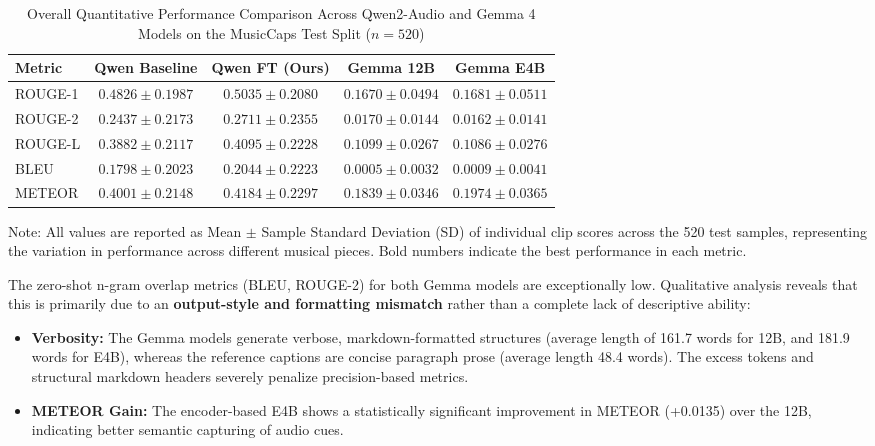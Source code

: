 \documentclass[12pt, conference, letterpaper]{IEEEtran}
\begin{document}
\begin{table}[t]
    \caption{Overall Quantitative Performance Comparison Across Qwen2-Audio and Gemma 4 Models on the MusicCaps Test Split ($n=520$)}
    \label{tab:gemma_zeroshot}
    \centering
    \footnotesize
    \begin{tabular}{lcccc}
        \toprule
        \textbf{Metric} & \textbf{Qwen Baseline} & \textbf{Qwen FT (Ours)}      & \textbf{Gemma 12B}  & \textbf{Gemma E4B}  \\ \midrule
        ROUGE-1         & $0.4826 \pm 0.1987$    & $\mathbf{0.5035 \pm 0.2080}$ & $0.1670 \pm 0.0494$ & $0.1681 \pm 0.0511$ \\
        ROUGE-2         & $0.2437 \pm 0.2173$    & $\mathbf{0.2711 \pm 0.2355}$ & $0.0170 \pm 0.0144$ & $0.0162 \pm 0.0141$ \\
        ROUGE-L         & $0.3882 \pm 0.2117$    & $\mathbf{0.4095 \pm 0.2228}$ & $0.1099 \pm 0.0267$ & $0.1086 \pm 0.0276$ \\
        BLEU            & $0.1798 \pm 0.2023$    & $\mathbf{0.2044 \pm 0.2223}$ & $0.0005 \pm 0.0032$ & $0.0009 \pm 0.0041$ \\
        METEOR          & $0.4001 \pm 0.2148$    & $\mathbf{0.4184 \pm 0.2297}$ & $0.1839 \pm 0.0346$ & $0.1974 \pm 0.0365$ \\
        \bottomrule
    \end{tabular}
    \vspace{1ex}
    \begin{flushleft}
        \scriptsize Note: All values are reported as Mean $\pm$ Sample Standard Deviation (SD) of individual clip scores across the 520 test samples, representing the variation in performance across different musical pieces. Bold numbers indicate the best performance in each metric.
    \end{flushleft}
\end{table}

The zero-shot n-gram overlap metrics (BLEU, ROUGE-2) for both Gemma models are exceptionally low. Qualitative analysis reveals that this is primarily due to an \textbf{output-style and formatting mismatch} rather than a complete lack of descriptive ability:
\begin{itemize}
    \item \textbf{Verbosity:} The Gemma models generate verbose, markdown-formatted structures (average length of 161.7 words for 12B, and 181.9 words for E4B), whereas the reference captions are concise paragraph prose (average length 48.4 words). The excess tokens and structural markdown headers severely penalize precision-based metrics.
    \item \textbf{METEOR Gain:} The encoder-based E4B shows a statistically significant improvement in METEOR (+0.0135) over the 12B, indicating better semantic capturing of audio cues.
\end{itemize}
\end{document}

